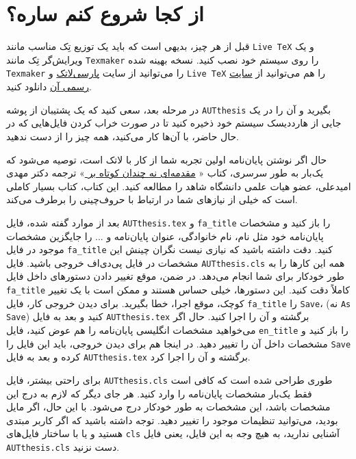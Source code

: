 \section{از کجا شروع کنم ساره؟}
قبل از هر چیز، بدیهی است که باید یک توزیع تِک مناسب مانند 
\verb;Live TeX;
و یک ویرایش‌گر تِک مانند
\verb;Texmaker;
را روی سیستم خود نصب کنید.  نسخه بهینه شده 
\verb;Texmaker;
را می‌توانید  از سایت 
 \href{http://www.parsilatex.com}{پارسی‌لاتک}%
 و
\verb;Live TeX;
را هم می‌توانید از 
 \href{http://www.tug.org/texlive}{سایت رسمی آن}%
 دانلود کنید.
 
در مرحله بعد، سعی کنید که  یک پشتیبان از پوشه 
\verb;AUTthesis;
 بگیرید و آن را در یک جایی از هارددیسک سیستم خود ذخیره کنید تا در صورت خراب کردن فایل‌هایی که در حال حاضر، با آن‌ها کار می‌کنید، همه چیز را از 
 دست ندهید.
 
 حال اگر نوشتن پایان‌نامه اولین تجربه شما از کار با لاتک است، توصیه می‌شود که یک‌بار به طور سرسری، کتاب «%
\href{http://www.tug.ctan.org/tex-archive/info/lshort/persian/lshort.pdf}{مقدمه‌ای نه چندان کوتاه بر
\lr{\LaTeXe}}»
   ترجمه دکتر مهدی امیدعلی، عضو هیات علمی دانشگاه شاهد را مطالعه کنید. این کتاب، کتاب بسیار کاملی است که خیلی از نیازهای شما در ارتباط با حروف‌چینی را برطرف می‌کند.
 
 
بعد از موارد گفته شده، فایل 
\verb;AUTthesis.tex;
و
\verb;fa_title;
را باز کنید و مشخصات پایان‌نامه خود مثل نام، نام خانوادگی، عنوان پایان‌نامه و ... را جایگزین مشخصات موجود در فایل
\verb;fa_title;
 کنید. دقت داشته باشید که نیازی نیست 
نگران چینش این مشخصات در فایل پی‌دی‌اف خروجی باشید. فایل 
\verb;AUTthesis.cls;
همه این کارها را به طور خودکار برای شما انجام می‌دهد. در ضمن، موقع تغییر دادن دستورهای داخل فایل
\verb;fa_title;
 کاملاً دقت کنید. این دستورها، خیلی حساس هستند و ممکن است با یک تغییر کوچک، موقع اجرا، خطا بگیرید. برای دیدن خروجی کار، فایل 
\verb;fa_title;
 را 
\verb;Save;، 
(نه 
\verb;As Save;)
کنید و بعد به فایل 
\verb;AUTthesis.tex;
برگشته و آن را اجرا کنید. حال اگر می‌خواهید مشخصات انگلیسی پایان‌نامه را هم عوض کنید، فایل 
\verb;en_title;
را باز کنید و مشخصات داخل آن را تغییر دهید.%
 در اینجا هم برای دیدن خروجی، باید این فایل را 
\verb;Save;
کرده و بعد به فایل 
\verb;AUTthesis.tex;
برگشته و آن را اجرا کرد.

برای راحتی بیشتر، 
فایل 
\verb;AUTthesis.cls;
طوری طراحی شده است که کافی است فقط  یک‌بار مشخصات پایان‌نامه  را وارد کنید. هر جای دیگر که لازم به درج این مشخصات باشد، این مشخصات به طور خودکار درج می‌شود. با این حال، اگر مایل بودید، می‌توانید تنظیمات موجود را تغییر دهید. توجه داشته باشید که اگر کاربر مبتدی هستید و یا با ساختار فایل‌های  
\verb;cls;
 آشنایی ندارید، به هیچ وجه به این فایل، یعنی فایل 
\verb;AUTthesis.cls;
دست نزنید.

